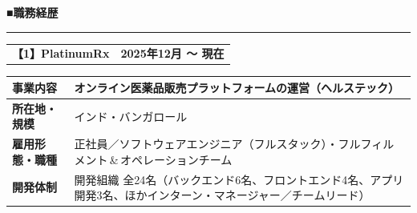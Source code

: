 \documentclass[a4paper,10pt]{ltjsarticle}
\makeatletter
\newcommand{\jsec}[1]{%
  \par\vspace{9pt}%
  {\color{accent}\gtfamily\bfseries\large #1}\par\vspace{-5pt}%
  {\color{accent}\rule{\textwidth}{0.8pt}}\par\vspace{5pt}}
\newcommand{\company}[2]{%
  \par\noindent
  \begingroup\setlength{\tabcolsep}{0pt}%
  \begin{tabular*}{\textwidth}{@{}l@{\extracolsep{\fill}}r@{}}
    \gtfamily\bfseries #1 & \bfseries #2 \\
  \end{tabular*}\endgroup\par\vspace{3pt}}
\makeatother
\begin{document}
\jsec{■\;職務経歴}

\company{【1】PlatinumRx}{2025年12月 〜 現在}
\begin{tabularx}{\textwidth}{|L{0.20\textwidth}|X|}
\hline
\textbf{事業内容} & オンライン医薬品販売プラットフォームの運営（ヘルステック） \\
\hline
\textbf{所在地・規模} & インド・バンガロール \\
\hline
\textbf{雇用形態・職種} & 正社員／ソフトウェアエンジニア（フルスタック）・フルフィルメント\,\&\,オペレーションチーム \\
\hline
\textbf{開発体制} & 開発組織 全24名（バックエンド6名、フロントエンド4名、アプリ開発3名、ほかインターン・マネージャー／チームリード） \\
\hline
\end{tabularx}
\vspace{4pt}
\end{document}
